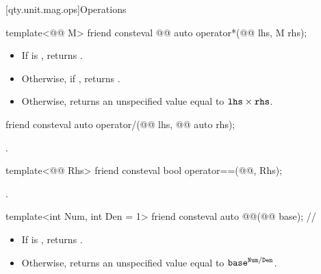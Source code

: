 [qty.unit.mag.ops]{Operations}

\begin{itemdecl}
template<@@ M>
friend consteval @@ auto operator*(@@ lhs, M rhs);
\end{itemdecl}

\begin{itemdescr}
\pnum
\returns
\begin{itemize}
\item
If  is , returns .
\item
Otherwise, if , returns .
\item
Otherwise, returns an unspecified value equal to $\texttt{\protect lhs} \times \texttt{\protect rhs}$.
\end{itemize}
\end{itemdescr}

\begin{itemdecl}
friend consteval auto operator/(@@ lhs, @@ auto rhs);
\end{itemdecl}

\begin{itemdescr}
\pnum
\returns
{}.
\end{itemdescr}

\begin{itemdecl}
template<@@ Rhs>
friend consteval bool operator==(@@, Rhs);
\end{itemdecl}

\begin{itemdescr}
\pnum
\returns
{}.
\end{itemdescr}

\begin{itemdecl}
template<int Num, int Den = 1>
friend consteval auto @@(@@ base);  // \expos
\end{itemdecl}

\begin{itemdescr}
\pnum
\returns
\begin{itemize}
\item
If  is , returns .
\item
Otherwise, returns an unspecified value equal to $\texttt{\protect base}^{\texttt{\protect Num}/\texttt{\protect Den}}$.
\end{itemize}
\end{itemdescr}

